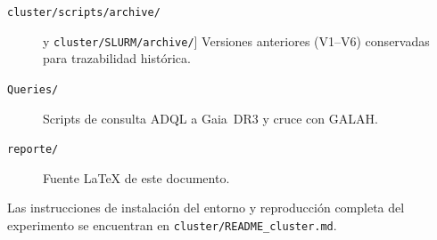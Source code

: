 \begin{description}
  \item[\texttt{cluster/scripts/archive/}] y \texttt{cluster/SLURM/archive/}]
    Versiones anteriores (V1--V6) conservadas para trazabilidad histórica.

  \item[\texttt{Queries/}]
    Scripts de consulta ADQL a Gaia~DR3 y cruce con GALAH.

  \item[\texttt{reporte/}]
    Fuente \LaTeX{} de este documento.
\end{description}

Las instrucciones de instalación del entorno y reproducción completa del
experimento se encuentran en \texttt{cluster/README\_cluster.md}.

